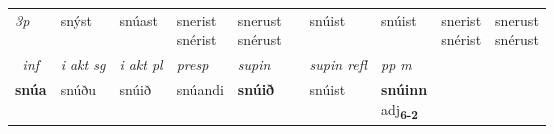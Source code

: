 \begin{tabular}{lllllllllll}
 {\textit{3p}}  & & snýst & snúast & \specialcell{snerist\\ snérist} & \specialcell{snerust\\ snérust} & & snúist & snúist& \specialcell{snerist\\ snérist} & \specialcell{snerust\\ snérust} \\*
\cmidrule{3-6} \cmidrule{8-11}

   \multicolumn{2}{c}{\textit{inf}}  & \textit{i akt sg} & \textit{i akt pl}   & \textit{presp} & \textit{supin} && \textit{supin refl} & \textit{pp m} \\*
  \multicolumn{2}{c}{\textbf{snúa}} & snúðu  & snúið   & snúandi &  \textbf{snúið} && snúist & \specialcell{\textbf{snúinn} \\ adj\textbf{\textsubscript{6-2}}} \\*
\end{tabular}

